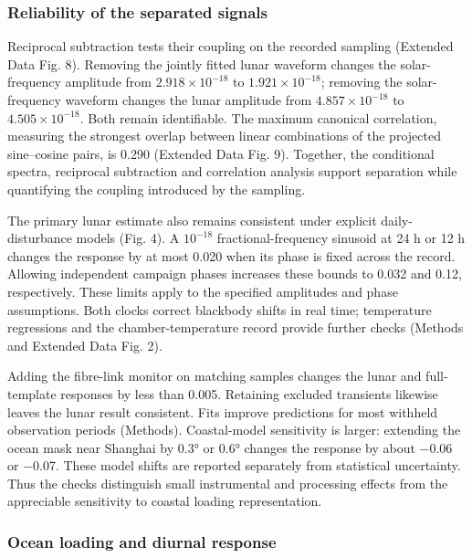 \documentclass[
  11pt,
  a4paper,
]{article}
\begin{document}
\hypertarget{reliability-of-the-separated-signals}{%
\subsubsection{Reliability of the separated
signals}\label{reliability-of-the-separated-signals}}

Reciprocal subtraction tests their coupling on the recorded sampling
(Extended Data Fig. 8). Removing the jointly fitted lunar waveform
changes the solar-frequency amplitude from \(2.918\times10^{-18}\) to
\(1.921\times10^{-18}\); removing the solar-frequency waveform changes
the lunar amplitude from \(4.857\times10^{-18}\) to
\(4.505\times10^{-18}\). Both remain identifiable. The maximum canonical
correlation, measuring the strongest overlap between linear combinations
of the projected sine--cosine pairs, is 0.290 (Extended Data Fig. 9).
Together, the conditional spectra, reciprocal subtraction and
correlation analysis support separation while quantifying the coupling
introduced by the sampling.

The primary lunar estimate also remains consistent under explicit
daily-disturbance models (Fig. 4). A \(10^{-18}\) fractional-frequency
sinusoid at 24 h or 12 h changes the response by at most 0.020 when its
phase is fixed across the record. Allowing independent campaign phases
increases these bounds to 0.032 and 0.12, respectively. These limits
apply to the specified amplitudes and phase assumptions. Both clocks
correct blackbody shifts in real time; temperature regressions and the
chamber-temperature record provide further checks (Methods and Extended
Data Fig. 2).

Adding the fibre-link monitor on matching samples changes the lunar and
full-template responses by less than 0.005. Retaining excluded
transients likewise leaves the lunar result consistent. Fits improve
predictions for most withheld observation periods (Methods).
Coastal-model sensitivity is larger: extending the ocean mask near
Shanghai by 0.3° or 0.6° changes the response by about −0.06 or −0.07.
These model shifts are reported separately from statistical uncertainty.
Thus the checks distinguish small instrumental and processing effects
from the appreciable sensitivity to coastal loading representation.

\hypertarget{ocean-loading-and-diurnal-response}{%
\subsubsection{Ocean loading and diurnal
response}\label{ocean-loading-and-diurnal-response}}
\end{document}
